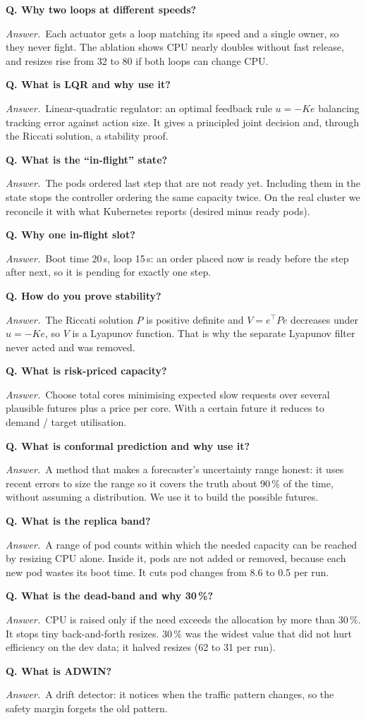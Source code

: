 \documentclass[11pt,a4paper]{article}
\newcommand{\Q}[1]{\par\medskip\textbf{Q. #1}\par}
\newcommand{\A}{\textit{Answer.}~}
\begin{document}
\Q{Why two loops at different speeds?}
\A Each actuator gets a loop matching its speed and a single owner, so they never fight.
The ablation shows CPU nearly doubles without fast release, and resizes rise from 32 to 80
if both loops can change CPU.

\Q{What is LQR and why use it?}
\A Linear-quadratic regulator: an optimal feedback rule $u=-Ke$ balancing tracking error
against action size. It gives a principled joint decision and, through the Riccati
solution, a stability proof.

\Q{What is the ``in-flight'' state?}
\A The pods ordered last step that are not ready yet. Including them in the state stops
the controller ordering the same capacity twice. On the real cluster we reconcile it with
what Kubernetes reports (desired minus ready pods).

\Q{Why one in-flight slot?}
\A Boot time 20\,s, loop 15\,s: an order placed now is ready before the step after next,
so it is pending for exactly one step.

\Q{How do you prove stability?}
\A The Riccati solution $P$ is positive definite and $V=e^\top P e$ decreases under
$u=-Ke$, so $V$ is a Lyapunov function. That is why the separate Lyapunov filter never
acted and was removed.

\Q{What is risk-priced capacity?}
\A Choose total cores minimising expected slow requests over several plausible futures
plus a price per core. With a certain future it reduces to demand / target utilisation.

\Q{What is conformal prediction and why use it?}
\A A method that makes a forecaster's uncertainty range honest: it uses recent errors to
size the range so it covers the truth about 90\,\% of the time, without assuming a
distribution. We use it to build the possible futures.

\Q{What is the replica band?}
\A A range of pod counts within which the needed capacity can be reached by resizing CPU
alone. Inside it, pods are not added or removed, because each new pod wastes its boot time.
It cuts pod changes from 8.6 to 0.5 per run.

\Q{What is the dead-band and why 30\,\%?}
\A CPU is raised only if the need exceeds the allocation by more than 30\,\%. It stops tiny
back-and-forth resizes. 30\,\% was the widest value that did not hurt efficiency on the dev
data; it halved resizes (62 to 31 per run).

\Q{What is ADWIN?}
\A A drift detector: it notices when the traffic pattern changes, so the safety margin
forgets the old pattern.
\end{document}

